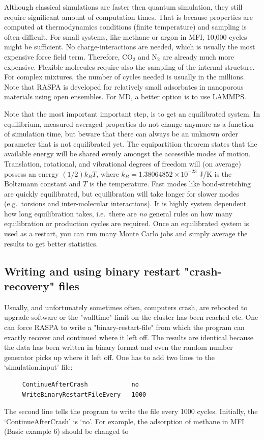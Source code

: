 Although classical simulations are faster then quantum simulation, they still require significant amount of computation times.
That is because properties are computed at thermodynamics conditions (finite temperature) and sampling is often difficult.
For small systems, like methane or argon in MFI,  10,000 cycles might be sufficient. No charge-interactions are needed, which is
usually the most expensive force field term. Therefore, CO$_2$ and N$_2$ are already much more expensive.
Flexible molecules require also the sampling of the internal structure. For complex mixtures, the number of cycles needed is
usually in the millions.
Note that RASPA is developed for relatively small adsorbates in nanoporous materials using open ensembles. 
For MD, a better option is to use LAMMPS\cite{Plimpton1995}.

Note that the most important important step, is to get an equilibrated system.
In equilibrium, measured averaged properties do not change
anymore as a function of simulation time,
but beware that there can always be an unknown order parameter that is not equilibrated yet.
The equipartition theorem states that the available energy will be shared evenly amongst the accessible modes of motion.
Translation, rotational, and vibrational degrees of freedom will (on average) possess an energy $(1/2) k_B T$,
where $k_B=1.38064852\times10^{-23}$ J/K is the Boltzmann constant and $T$ is the temperature.
Fast modes like bond-stretching are quickly equilibrated, but equilibration will take longer for slower modes (e.g.\ torsions and inter-molecular interactions).
It is highly system dependent how long equilibration takes, i.e.\
there are \emph{no} general rules on how many equilibration or production cycles are required.
Once an equilibrated system is used as a restart, you can run many Monte Carlo jobs and simply average the results to get better statistics.



\subsection*{Writing and using binary restart "crash-recovery" files}

Usually, and unfortunately sometimes often, computers crash, are rebooted to upgrade software or the "walltime"-limit on the cluster has been reached etc.
One can force RASPA to write a "binary-restart-file" from which the program can exactly recover and continued
where it left off. The results are identical because the data has been written in binary format and even the
random number generator picks up where it left off.
One has to add two lines to the `simulation.input' file:
\begin{tiny}
\begin{verbatim}
     ContinueAfterCrash            no
     WriteBinaryRestartFileEvery   1000
\end{verbatim}
\end{tiny}
The second line tells the program to write the file every 1000 cycles. Initially, the `ContinueAfterCrash' is `no'.
For example, the adsorption of methane in MFI (Basic example 6) should be changed to

